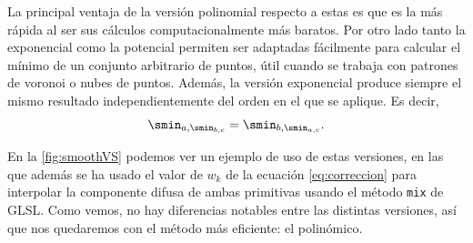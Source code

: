 La principal ventaja de la versión polinomial respecto a estas es que es la más rápida al ser sus cálculos computacionalmente más baratos. Por otro lado tanto la exponencial como la potencial permiten ser adaptadas fácilmente para calcular el mínimo de un conjunto arbitrario de puntos, útil cuando se trabaja con patrones de voronoi o nubes de puntos. Además, la versión exponencial produce siempre el mismo resultado independientemente del orden en el que se aplique. Es decir,
\begin{equation*}
    \smin_{a,\smin_{b,c}} = \smin_{b,\smin_{a,c}}.
\end{equation*}

En la \autoref{fig:smoothVS} podemos ver un ejemplo de uso de estas versiones, en las que además se ha usado el valor de $w_k$ de la ecuación \autoref{eq:correccion} para interpolar la componente difusa de ambas primitivas usando el método \texttt{mix} de GLSL. Como vemos, no hay diferencias notables entre las distintas versiones, así que nos quedaremos con el método más eficiente: el polinómico.
